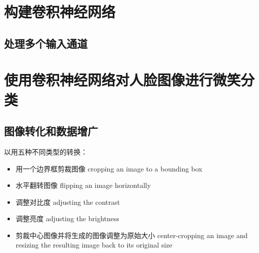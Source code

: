 \section{构建卷积神经网络}
\subsection{处理多个输入通道}

\section{使用卷积神经网络对人脸图像进行微笑分类}
\subsection{图像转化和数据增广}
以用五种不同类型的转换：
\begin{itemize}
    \item 用一个边界框剪裁图像 cropping an image to a bounding box
    \item 水平翻转图像 flipping an image horizontally
    \item 调整对比度 adjusting the contrast
    \item 调整亮度 adjusting the brightness
    \item 剪裁中心图像并将生成的图像调整为原始大小 center-cropping an image and resizing the resulting image back to
          its original size
\end{itemize}